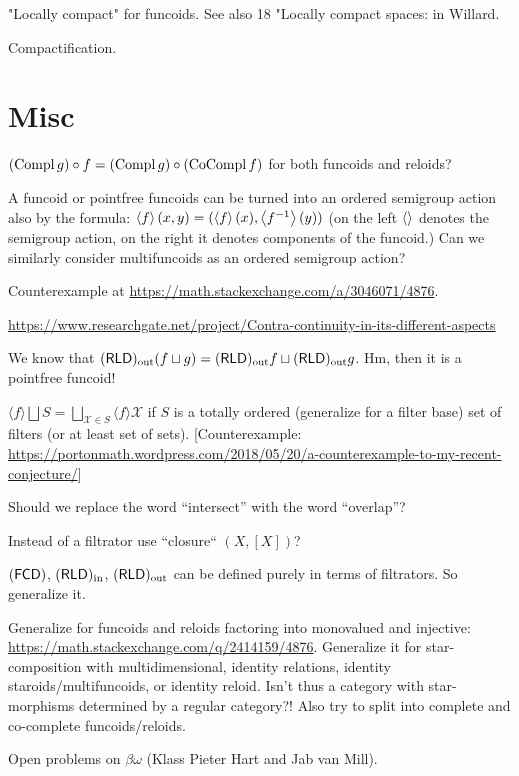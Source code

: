 \documentclass{amsart}
\begin{document}
"Locally compact" for funcoids. See also 18 "Locally compact spaces: in Willard.

Compactification.

\section{Misc}

$(\operatorname{Compl} g)\circ f=(\operatorname{Compl} g)\circ(\operatorname{CoCompl} f)$ for both funcoids and reloids?

A funcoid or pointfree funcoids can be turned into an ordered semigroup action also by the formula: $\left\langle f\right\rangle(x,y)=(\left\langle f\right\rangle(x),\left\langle f^{-1}\right\rangle(y))$ (on the left $\left\langle \right\rangle$ denotes the semigroup action, on the right it denotes components of the funcoid.) Can we similarly consider multifuncoids as an ordered semigroup action?

Counterexample at \url{https://math.stackexchange.com/a/3046071/4876}.

\url{https://www.researchgate.net/project/Contra-continuity-in-its-different-aspects}

We know that $(\mathsf{RLD})_{\mathrm{out}}(f\sqcup g) = (\mathsf{RLD})_{\mathrm{out}} f\sqcup(\mathsf{RLD})_{\mathrm{out}} g$.
Hm, then it is a pointfree funcoid!

\begin{conjecture}
$\langle f \rangle \bigsqcup S = \bigsqcup_{\mathcal{X} \in S} \langle f
\rangle \mathcal{X}$ if $S$ is a totally ordered (generalize for a filter
base) set of filters (or at least set of sets).
[Counterexample: \url{https://portonmath.wordpress.com/2018/05/20/a-counterexample-to-my-recent-conjecture/}]
\end{conjecture}

Should we replace the word ``intersect'' with the word ``overlap''?

Instead of a filtrator use ``closure`` $(X,[X])$?

$(\mathsf{FCD})$, $(\mathsf{RLD})_{\mathrm{in}}$, $(\mathsf{RLD})_{\mathrm{out}}$ can be defined purely in terms of filtrators.
So generalize it.

Generalize for funcoids and reloids factoring into monovalued and injective:\\
\url{https://math.stackexchange.com/q/2414159/4876}.
Generalize it for star-composition with multidimensional, identity relations, identity staroids/multifuncoids, or identity reloid.
Isn't thus a category with star-morphisms determined by a regular category?!
Also try to split into complete and co-complete funcoids/reloids.

Open problems on $\beta\omega$ (Klass Pieter Hart and Jab van Mill).
\end{document}
